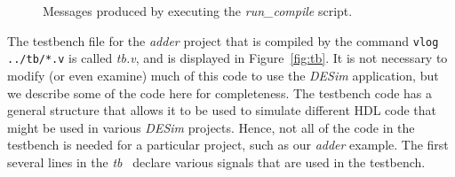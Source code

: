 {\begin{figure}[H]
	\begin{center}
        \setlength{\fboxsep}{0pt}
        {}
        {}
	\end{center}
          \caption{Messages produced by executing the {\it run\_compile} script.}
	\label{fig:compile}
\end{figure}

The testbench file for the {\it adder} project that is compiled by the command 
\texttt{vlog ../tb/*.v} is called {\it tb.v}, and is displayed in Figure~\ref{fig:tb}. 
It is not necessary to modify (or even examine) much of this code to use the {\it DESim}
application, but we describe some of the code here for completeness.  The testbench code 
has a general structure that allows it to be used to simulate different HDL code that might 
be used in various {\it DESim} projects. Hence, not all of the code in the testbench is 
needed for a particular project, such as our {\it adder} example. The first several lines in 
the {\it tb} \hdlModuleName~declare various signals that are used in the testbench. 

}
